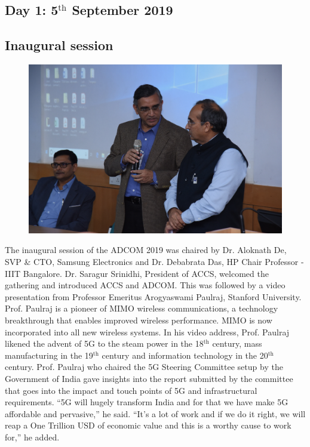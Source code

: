 \begin{multicols}{2}
\section*{Day 1: 5$^{\text{th}}$ September 2019}

\subsection*{Inaugural session}

\setcounter{figure}{0}
\begin{figure}[H]
\centering
\includegraphics[scale=.88]{src/Figures/events/event-fig06.jpg}
\vspace{-2ex}
\end{figure}

The inaugural session of the ADCOM 2019 was chaired by Dr. Aloknath De, SVP \& CTO, Samsung Electronics and Dr.  Debabrata Das, HP Chair Professor - IIIT Bangalore. Dr. Saragur Srinidhi, President of ACCS, welcomed the gathering and introduced ACCS and ADCOM. This was followed by a video presentation from Professor Emeritus Arogyaswami Paulraj, Stanford University. Prof. Paulraj is a pioneer of MIMO wireless communications, a technology breakthrough that enables improved wireless performance. MIMO is now incorporated into all new wireless systems. In his video address, Prof. Paulraj likened the advent of 5G to the steam power in the 18$^{\text{th}}$ century, mass manufacturing in the 19$^{\text{th}}$ century and information technology in the 20$^{\text{th}}$ century. Prof. Paulraj who chaired the 5G Steering Committee setup by the Government of India gave insights into the report submitted by the committee that goes into the impact and touch points of 5G and infrastructural requirements. “5G will hugely transform India and for that we have make 5G affordable and pervasive,” he said. “It’s a lot of work and if we do it right, we will reap a One Trillion USD of economic value and this is a worthy cause to work for,” he added.


\end{multicols}
